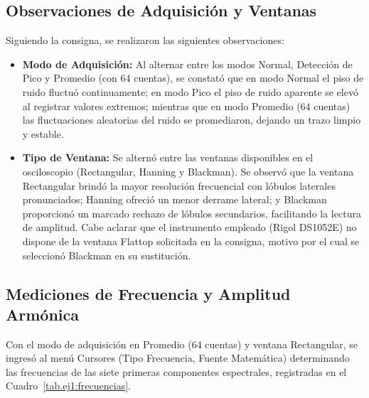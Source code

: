 \subsection{Observaciones de Adquisición y Ventanas}
Siguiendo la consigna, se realizaron las siguientes observaciones:
\begin{itemize}
    \item \textbf{Modo de Adquisición:} Al alternar entre los modos Normal, Detección de Pico y Promedio (con 64 cuentas),
    se constató que en modo Normal el piso de ruido fluctuó continuamente; en modo Pico el piso de ruido aparente se
    elevó al registrar valores extremos; mientras que en modo Promedio (64 cuentas) las fluctuaciones aleatorias del
    ruido se promediaron, dejando un trazo limpio y estable.
    \item \textbf{Tipo de Ventana:} Se alternó entre las ventanas disponibles en el osciloscopio (Rectangular, Hanning y Blackman). Se observó que la ventana Rectangular brindó la mayor resolución frecuencial con lóbulos laterales pronunciados; Hanning ofreció un menor derrame lateral; y Blackman proporcionó un marcado rechazo de lóbulos secundarios, facilitando la lectura de amplitud. Cabe aclarar que el instrumento empleado (Rigol DS1052E) no dispone de la ventana Flattop solicitada en la consigna, motivo por el cual se seleccionó Blackman en su sustitución.
\end{itemize}

\subsection{Mediciones de Frecuencia y Amplitud Armónica}
Con el modo de adquisición en Promedio (64 cuentas) y ventana Rectangular, se ingresó al menú Cursores (Tipo Frecuencia,
Fuente Matemática) determinando las frecuencias de las siete primeras componentes espectrales, registradas en el
Cuadro~\ref{tab.ej1:frecuencias}.

\begin{table}[!ht]
    \centering
    \caption{Frecuencias de las siete primeras componentes espectrales medidas en la onda cuadrada ($k=2$).}
    \label{tab.ej1:frecuencias}
\end{table}

